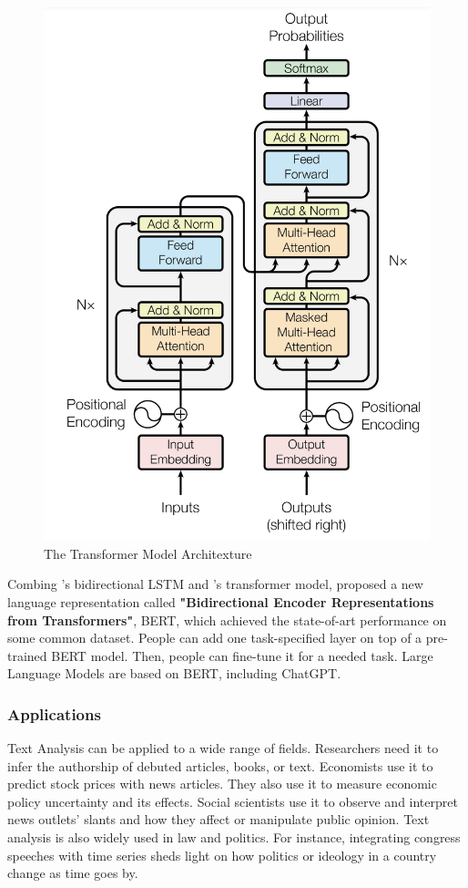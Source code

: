 \documentclass[aoas]{imsart}
\numberwithin{equation}{section}
\theoremstyle{plain}
\theoremstyle{remark}
\begin{document}
\begin{figure}[ht]
\includegraphics[scale=0.4]{img/trans.png}
\caption{The Transformer Model Architexture}
\label{Fig5: trans}
\end{figure}
Combing \cite{DBLP:journals/corr/LiuSLW16}'s bidirectional LSTM and \cite{DBLP:journals/corr/VaswaniSPUJGKP17}'s transformer model, \cite{DBLP:journals/corr/abs-1810-04805} proposed a new language representation called \textbf{"Bidirectional Encoder Representations from Transformers"}, BERT, which achieved the state-of-art performance on some common dataset. People can add one task-specified layer on top of a pre-trained BERT model. Then, people can fine-tune it for a needed task. Large Language Models are based on BERT, including ChatGPT. 

\subsubsection{Applications} 
Text Analysis can be applied to a wide range of fields. Researchers need it to infer the authorship of debuted articles, books, or text. Economists use it to predict stock prices with news articles. They also use it to measure economic policy uncertainty and its effects. Social scientists use it to observe and interpret news outlets' slants and how they affect or manipulate public opinion. Text analysis is also widely used in law and politics. For instance, integrating congress speeches with time series sheds light on how politics or ideology in a country change as time goes by. 
\end{document}
